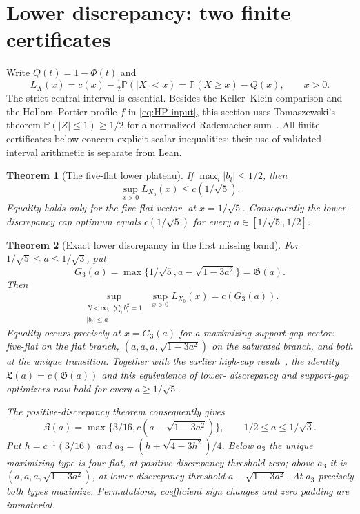 \documentclass[11pt]{article}
\newtheorem{theorem}{Theorem}[section]
\theoremstyle{remark}\newtheorem{remark}[theorem]{Remark}
\newcommand{\Pp}{\mathbb P}
\begin{document}
\section{Lower discrepancy: two finite certificates}\label{sec:lower-certificates}
Write $Q(t)=1-\Phi(t)$ and
\[
 L_X(x)=c(x)-\tfrac12\Pp(|X|<x)=\Pp(X\ge x)-Q(x),\qquad x>0.
\]
The strict central interval is essential. Besides the Keller--Klein
comparison and the Hollom--Portier profile $f$ in
\eqref{eq:HP-input}, this section uses Tomaszewski's theorem
$\Pp(|Z|\le1)\ge1/2$ for a normalized Rademacher sum~\cite{KK}.
All finite certificates below concern explicit scalar inequalities;
their use of validated interval arithmetic is separate from Lean.

\begin{theorem}[The five-flat lower plateau]\label{thm:five-flat-lower}
If $\max_i|b_i|\le1/2$, then
\[
 \sup_{x>0}L_{X_b}(x)\le c(1/\sqrt5).
\]
Equality holds only for the five-flat vector, at $x=1/\sqrt5$.
Consequently the lower-discrepancy cap optimum equals $c(1/\sqrt5)$
for every $a\in[1/\sqrt5,1/2]$.
\end{theorem}

\begin{theorem}[Exact lower discrepancy in the first missing band]\label{thm:three-core-lower}
For $1/\sqrt5\le a\le1/\sqrt3$, put
\[
 G_3(a)=\max\{1/\sqrt5,a-\sqrt{1-3a^2}\}=\mathfrak G(a).
\]
Then
\begin{equation}\label{eq:lower-exact-first-band}
 \sup_{\substack{N<\infty,\ \sum_i b_i^2=1\\ |b_i|\le a}}\ \sup_{x>0}L_{X_b}(x)=c(G_3(a)).
\end{equation}
Equality occurs precisely at $x=G_3(a)$ for a maximizing support-gap
vector: five-flat on the flat branch, $(a,a,a,\sqrt{1-3a^2})$ on
the saturated branch, and both at the unique transition.
Together with the earlier high-cap result~\cite{Prior}, the identity
$\mathfrak L(a)=c(\mathfrak G(a))$ and this equivalence of lower-
discrepancy and support-gap optimizers now hold for every
$a\ge1/\sqrt5$.

The positive-discrepancy theorem consequently gives
\begin{equation}\label{eq:full-half-third}
 \mathfrak K(a)=\max\{3/16,c(a-\sqrt{1-3a^2})\},
 \qquad 1/2\le a\le1/\sqrt3.
\end{equation}
Put $h=c^{-1}(3/16)$ and
$a_3=(h+\sqrt{4-3h^2})/4$. Below $a_3$ the unique maximizing type
is four-flat, at positive-discrepancy threshold zero; above $a_3$
it is $(a,a,a,\sqrt{1-3a^2})$, at lower-discrepancy threshold
$a-\sqrt{1-3a^2}$. At $a_3$ precisely both types maximize.
Permutations, coefficient sign changes and zero padding are immaterial.
\end{theorem}
\end{document}
